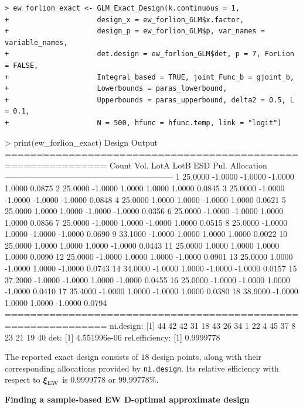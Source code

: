 \begin{Verbatim}
> ew_forlion_exact <- GLM_Exact_Design(k.continuous = 1,
+                     design_x = ew_forlion_GLM$x.factor, 
+                     design_p = ew_forlion_GLM$p, var_names = variable_names, 
+                     det.design = ew_forlion_GLM$det, p = 7, ForLion = FALSE, 
+                     Integral_based = TRUE, joint_Func_b = gjoint_b,
+                     Lowerbounds = paras_lowerbound, 
+                     Upperbounds = paras_upperbound, delta2 = 0.5, L = 0.1,
+                     N = 500, hfunc = hfunc.temp, link = "logit")
\end{Verbatim}
\begin{example}
> print(ew_forlion_exact)
Design Output
============================================================== 
Count  Vol.     LotA     LotB     ESD      Pul.     Allocation
-------------------------------------------------------------- 
1      25.0000  -1.0000  -1.0000  -1.0000   1.0000  0.0875
2      25.0000  -1.0000   1.0000   1.0000   1.0000  0.0845
3      25.0000  -1.0000  -1.0000  -1.0000  -1.0000  0.0848
4      25.0000   1.0000   1.0000  -1.0000   1.0000  0.0621
5      25.0000   1.0000   1.0000  -1.0000  -1.0000  0.0356
6      25.0000  -1.0000  -1.0000   1.0000   1.0000  0.0856
7      25.0000  -1.0000   1.0000  -1.0000   1.0000  0.0515
8      25.0000  -1.0000   1.0000  -1.0000  -1.0000  0.0690
9      33.1000  -1.0000   1.0000   1.0000   1.0000  0.0022
10     25.0000   1.0000   1.0000   1.0000  -1.0000  0.0443
11     25.0000   1.0000   1.0000   1.0000   1.0000  0.0090
12     25.0000  -1.0000   1.0000   1.0000  -1.0000  0.0901
13     25.0000   1.0000  -1.0000   1.0000  -1.0000  0.0743
14     34.0000  -1.0000   1.0000  -1.0000  -1.0000  0.0157
15     37.2000  -1.0000  -1.0000   1.0000  -1.0000  0.0455
16     25.0000  -1.0000  -1.0000   1.0000  -1.0000  0.0410
17     35.4000  -1.0000   1.0000  -1.0000   1.0000  0.0380
18     38.9000  -1.0000   1.0000   1.0000  -1.0000  0.0794
============================================================== 
ni.design:
 [1] 44 42 42 31 18 43 26 34  1 22  4 45 37  8 23 21 19 40
det:
[1] 4.551996e-06
rel.efficiency:
[1] 0.9999778
\end{example}

The reported exact design consists of $18$ design points, along with their corresponding allocations provided by {\tt ni.design}. Its relative efficiency with respect to $\boldsymbol{\xi}_{\rm EW}$ is $0.9999778$ or $99.99778\%$. 

\medskip
\noindent
{\bf Finding a sample-based EW D-optimal approximate design}
\smallskip

